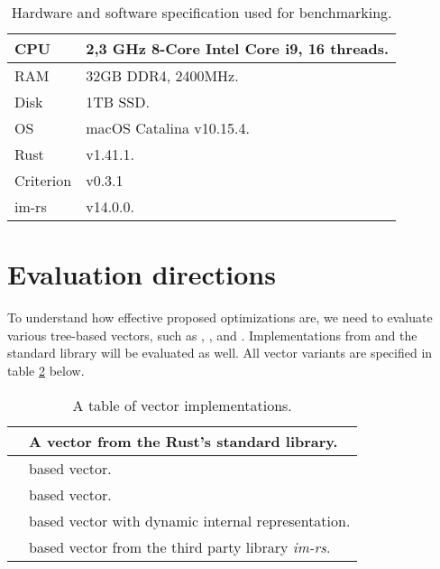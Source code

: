 \begin{table}[!htbp]
    \centering

    \begin{tabular} { |l| p{11cm} | }
        \hline CPU & 2,3 GHz 8-Core Intel Core i9, 16 threads. \\ \hline
        RAM & 32GB DDR4, 2400MHz. \\ \hline
        Disk & 1TB SSD. \\ \hline
        OS & macOS Catalina v10.15.4. \\ \hline
        Rust & v1.41.1. \\ \hline
        Criterion & v0.3.1 \\ \hline
        im-rs & v14.0.0. \\ \hline
    \end{tabular}

    \label{tab:exec-environment}
    \caption{Hardware and software specification used for benchmarking.}
\end{table}

\section{Evaluation directions}
To understand how effective proposed optimizations are, we need to evaluate various tree-based vectors, such as \rbvec{}, \rrbvec{}, and \pvec{}. Implementations from \imrsvec{} and the standard library will be evaluated as well. All vector variants are specified in table \ref{tab:vec-implementations} below.

\begin{table}[!htbp]
    \centering

    \begin{tabular} { |l| p{11cm} | }
        \hline
        \stdvec{} & A vector from the Rust's standard library. \\ \hline
        \rbvec{} & \rbtree{} based vector. \\ \hline
        \rrbvec{} & \rrbtree{} based vector. \\ \hline
        \pvec{} & \rrbtree{} based vector with dynamic internal representation. \\ \hline
        \imrsvec{} & \rrbtree{} based vector from the third party library \emph{im-rs}\footnotemark{}. \\ \hline
    \end{tabular}

    \label{tab:vec-implementations}
    \caption{A table of vector implementations.}
\end{table}

